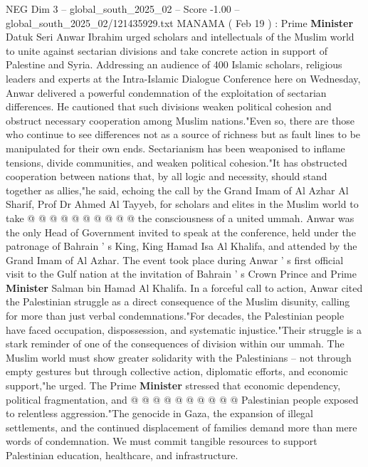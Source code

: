 \begin{textsample}{NEG Dim 3 – global\_south\_2025\_02 – Score -1.00 – global\_south\_2025\_02/121435929.txt}  \label{ex:f3_neg_009}
MANAMA ( Feb 19 ) : Prime \textbf{Minister} Datuk Seri Anwar Ibrahim urged scholars and intellectuals of the Muslim world to unite against sectarian divisions and take concrete action in support of Palestine and Syria.
Addressing an audience of 400 Islamic scholars, religious leaders and experts at the Intra-Islamic Dialogue Conference here on Wednesday, Anwar delivered a powerful condemnation of the exploitation of sectarian differences.
He cautioned that such divisions weaken political cohesion and obstruct necessary cooperation among Muslim nations."Even so, there are those who continue to see differences not as a source of richness but as fault lines to be manipulated for their own ends.
Sectarianism has been weaponised to inflame tensions, divide communities, and weaken political cohesion."It has obstructed cooperation between nations that, by all logic and necessity, should stand together as allies,"he said, echoing the call by the Grand Imam of Al Azhar Al Sharif, Prof Dr Ahmed Al Tayyeb, for scholars and elites in the Muslim world to take @ @ @ @ @ @ @ @ @ @ the consciousness of a united ummah.
Anwar was the only Head of Government invited to speak at the conference, held under the patronage of Bahrain ' s King, King Hamad Isa Al Khalifa, and attended by the Grand Imam of Al Azhar.
The event took place during Anwar ' s first official visit to the Gulf nation at the invitation of Bahrain ' s Crown Prince and Prime \textbf{Minister} Salman bin Hamad Al Khalifa.
In a forceful call to action, Anwar cited the Palestinian struggle as a direct consequence of the Muslim disunity, calling for more than just verbal condemnations."For decades, the Palestinian people have faced occupation, dispossession, and systematic injustice."Their struggle is a stark reminder of one of the consequences of division within our ummah.
The Muslim world must show greater solidarity with the Palestinians -- not through empty gestures but through collective action, diplomatic efforts, and economic support,"he urged.
The Prime \textbf{Minister} stressed that economic dependency, political fragmentation, and @ @ @ @ @ @ @ @ @ @ Palestinian people exposed to relentless aggression."The genocide in Gaza, the expansion of illegal settlements, and the continued displacement of families demand more than mere words of condemnation.
We must commit tangible resources to support Palestinian education, healthcare, and infrastructure.

\end{textsample}
